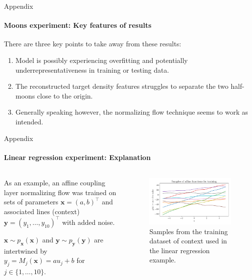 \documentclass{beamer}
\newcommand\vect[1]{\ensuremath{\bm{#1}}}
\begin{document}
\begin{frame}[allowframebreaks]{Appendix}
	\framesubtitle{Moons experiment: Key features of results}
	There are three key points to take away from these results:
	\begin{enumerate}
		\item Model is possibly experiencing overfitting and potentially underrepresentativeness in training or testing data.
		\item The reconstructed target density features struggles to separate the two half-moons close to the origin.
		\item Generally speaking however, the normalizing flow technique seems to work as intended.
	\end{enumerate}
\end{frame}

\begin{frame}[allowframebreaks]{Appendix}
	\framesubtitle{Linear regression experiment: Explanation}
	\begin{columns}
		\begin{column}{0.49\textwidth}
			As an example, an affine coupling layer normalizing flow was trained on sets of parameters $\vect{x} = (a, b)^\top$ and associated lines (context) $\vect{y} = (y_1,\dots,y_{10})^\top$ with added noise.
			
			$\vect{x} \sim p_{\vect{x}}(\vect{x})$ and $\vect{y} \sim p_{\vect{y}}(\vect{y})$ are intertwined by $y_j = M_j(\vect{x}) = au_j + b$ for $j \in \{1,\dots,10\}$.
		\end{column}
		\begin{column}{0.49\textwidth}
			\begin{figure}[h]
				\centering
				\includegraphics[width=\textwidth]{figures/thesis/nf-linear-regression-example-linesamples.pdf}
				\caption{Samples from the training dataset of context used in the linear regression example.}
				\label{fig:sample-lines}
			\end{figure}
		\end{column}
	\end{columns}
\end{frame}
\end{document}
